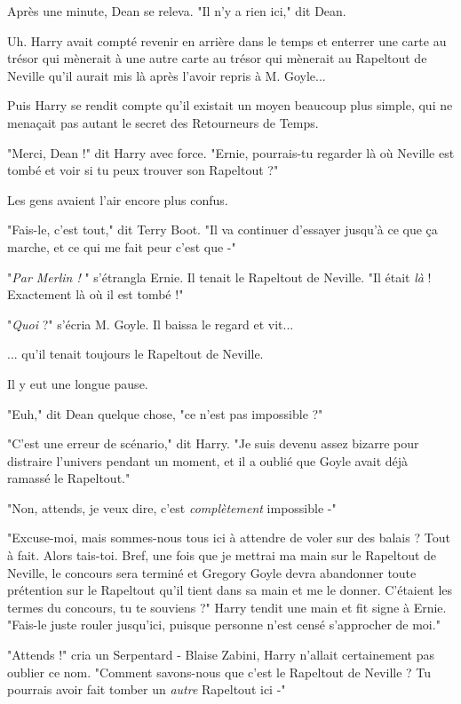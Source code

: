Après une minute, Dean se releva. "Il n'y a rien ici," dit Dean.

Uh. Harry avait compté revenir en arrière dans le temps et enterrer une carte au trésor qui mènerait à une autre carte au trésor qui mènerait au Rapeltout de Neville qu'il aurait mis là après l'avoir repris à M. Goyle...

Puis Harry se rendit compte qu'il existait un moyen beaucoup plus simple, qui ne menaçait pas autant le secret des Retourneurs de Temps.

"Merci, Dean !" dit Harry avec force. "Ernie, pourrais-tu regarder là où Neville est tombé et voir si tu peux trouver son Rapeltout ?"

Les gens avaient l'air encore plus confus.

"Fais-le, c'est tout," dit Terry Boot. "Il va continuer d'essayer jusqu'à ce que ça marche, et ce qui me fait peur c'est que -"

"\emph{Par Merlin !} " s'étrangla Ernie. Il tenait le Rapeltout de Neville. "Il était \emph{là}  ! Exactement là où il est tombé !"

"\emph{Quoi}  ?" s'écria M. Goyle. Il baissa le regard et vit...

... qu'il tenait toujours le Rapeltout de Neville.

Il y eut une longue pause.

"Euh," dit Dean quelque chose, "ce n'est pas impossible ?"

"C'est une erreur de scénario," dit Harry. "Je suis devenu assez bizarre pour distraire l'univers pendant un moment, et il a oublié que Goyle avait déjà ramassé le Rapeltout."

"Non, attends, je veux dire, c'est \emph{complètement}  impossible -"

"Excuse-moi, mais sommes-nous tous ici à attendre de voler sur des balais ? Tout à fait. Alors tais-toi. Bref, une fois que je mettrai ma main sur le Rapeltout de Neville, le concours sera terminé et Gregory Goyle devra abandonner toute prétention sur le Rapeltout qu'il tient dans sa main et me le donner. C'étaient les termes du concours, tu te souviens ?" Harry tendit une main et fit signe à Ernie. "Fais-le juste rouler jusqu'ici, puisque personne n'est censé s'approcher de moi."

"Attends !" cria un Serpentard - Blaise Zabini, Harry n'allait certainement pas oublier ce nom. "Comment savons-nous que c'est le Rapeltout de Neville ? Tu pourrais avoir fait tomber un \emph{autre}  Rapeltout ici -"

